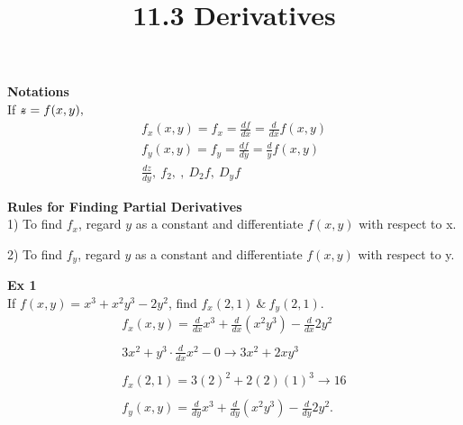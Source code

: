 \documentclass{article}
\title{11.3 Derivatives}
\begin{document}
  \maketitle
  \textbf{Notations}\\
  If $ \zstroke = f(x,y), $
  \[
    \begin{gathered}
    f_{x}(x,y)=f_{x}=\frac{df}{dx}=\frac{d}{dx} f(x,y)\\
    f_{y}(x,y)=f_{y}=\frac{df}{dy}=\frac{d}{y} f(x,y)\\
    \frac{dz}{dy},~ f_{2},~,~D_{2}f,~D_{y}f    
    \end{gathered}
  \]

  \textbf{Rules for Finding Partial Derivatives}\\
  1) To find $ f_{x} $, regard $ y $ as a constant and differentiate $ f(x,y) $ with respect to x.

  2) To find $ f_{y}  $, regard $ y $ as a constant and differentiate $ f(x,y) $ with respect to y.

  \textbf{Ex 1}\\
  If $ f(x,y) =x^{3}+x^{2}y^{3}-2y^{2}    $, find $ f_{x}(2,1) ~\&~ f_{y}(2,1)$.
  \[
    \begin{gathered}
      f_{x}(x,y)= \frac{d}{dx}x^{3}+\frac{d}{dx}(x^{2}y^{3})-\frac{d}{dx}{2y^{2}}\\
      ~\\
      3x^{2}+  y^{3} \cdot \frac{d}{dx}x^{2}-0\to 3x^{2}+2xy^{3}\\
      ~\\
      f_{x}(2,1) = 3(2)^{2} + 2(2)(1)^{3}\to \boxed{16}\\
      ~\\
      f_{y}(x,y)= \frac{d}{dy}x^{3}+\frac{d}{dy}(x^{2}y^{3})-\frac{d}{dy}2y^{2}.      
    \end{gathered}
  \]
  
   
\end{document}
